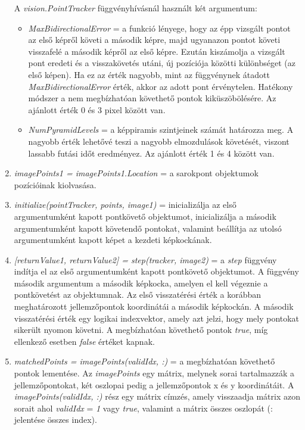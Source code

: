 \documentclass[12pt]{report}
\begin{document}
\begin{enumerate}
                    A \textit{vision.PointTracker} függvényhívásnál használt két argumentum:
                    \begin{itemize}
                        \item \textit{MaxBidirectionalError} = a funkció lényege, hogy az épp vizsgált pontot az első képről követi a második képre, majd ugyanazon pontot követi visszafelé a második képről az első képre. Ezután kiszámolja a vizsgált pont eredeti és a visszakövetés utáni, új pozíciója közötti különbséget (az első képen). Ha ez az érték nagyobb, mint az függvénynek átadott \textit{MaxBidirectionalError} érték, akkor az adott pont érvénytelen. Hatékony módszer a nem megbízhatóan követhető pontok kiküszöbölésére. Az ajánlott érték 0 és 3 pixel között van.
                        \item \textit{NumPyramidLevels} = a képpiramis szintjeinek számát határozza meg. A nagyobb érték lehetővé teszi a nagyobb elmozdulások követését, viszont lassabb futási időt eredményez. Az ajánlott érték 1 és 4 között van.
                    \end{itemize}
                    \item \textit{imagePoints1 = imagePoints1.Location} = a sarokpont objektumok pozícióinak kiolvasása.
                    \item \textit{initialize(pointTracker, points, image1)} = inicializálja az első argumentumként kapott pontkövető objektumot, inicializálja a második argumentumként kapott követendő pontokat, valamint beállítja az utolsó argumentumként kapott képet a kezdeti képkockának.
                    \item \textit{[returnValue1, returnValue2] = step(tracker, image2)} = a \textit{step} függvény indítja el az első argumentumként kapott pontkövető objektumot. A függvény második argumentum a második képkocka, amelyen el kell végeznie a pontkövetést az objektumnak. Az első visszatérési érték a korábban meghatározott jellemzőpontok koordinátái a második képkockán. A második visszatérési érték egy logikai indexvektor, amely azt jelzi, hogy mely pontokat sikerült nyomon követni. A megbízhatóan követhető pontok \textit{true}, míg ellenkező esetben \textit{false} értéket kapnak.
                    \item \textit{matchedPoints = imagePoints(validIdx, :)} = a megbízhatóan követhető pontok lementése. Az \textit{imagePoints} egy mátrix, melynek sorai tartalmazzák a jellemzőpontokat, két oszlopai pedig a jellemzőpontok x és y koordinátáit. A \textit{imagePoints(validIdx, :)} rész egy mátrix címzés, amely visszaadja mátrix azon sorait ahol \textit{validIdx} = \textit{1} vagy \textit{true}, valamint a mátrix összes oszlopát (: jelentése összes index).

\end{enumerate}
\end{document}
